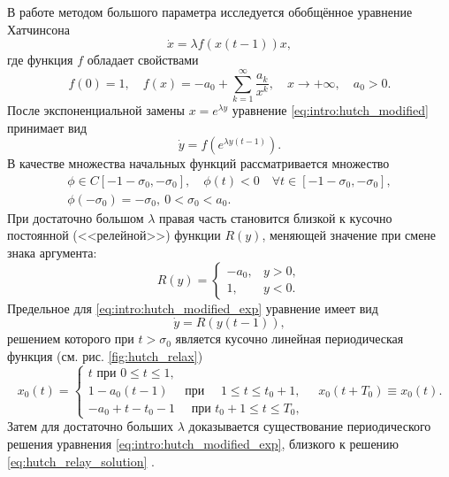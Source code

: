 В работе \cite{Kolesov2010} методом большого параметра исследуется обобщённое уравнение Хатчинсона
\begin{equation}
	\label{eq:intro:hutch_modified}
	\dot{x} = \lambda f(x(t - 1)) x,
\end{equation}
%
где функция $f$ обладает свойствами
\[
f(0) = 1, \quad f(x) = -a_0 + \sum\limits_{k = 1}^{\infty} \frac{a_k}{x^k}, \quad x \to +\infty, \quad a_0 > 0.
\]
После экспоненциальной замены $x = e^{\lambda y}$ уравнение \eqref{eq:intro:hutch_modified} принимает вид
\begin{equation}
	\label{eq:intro:hutch_modified_exp}
	\dot{y} = f(e^{\lambda y(t - 1)}).
\end{equation}
В качестве множества начальных функций рассматривается множество
\begin{multline}
	\label{eq:intro:hutch_init_func}
	\phi \in C[-1 - \sigma_0, -\sigma_0],\quad \phi(t) < 0 \quad \forall t \in [-1 - \sigma_0, -\sigma_0], \\ \phi(-\sigma_0) = -\sigma_0, \ 0 < \sigma_0 < a_0.
\end{multline}
При достаточно большом $\lambda$ правая часть становится близкой к кусочно постоянной (<<релейной>>) функции $R(y)$, меняющей значение при смене знака аргумента:
\[
R(y) = \begin{cases}
	-a_0, & y > 0,\\
	1, & y < 0.
\end{cases}
\]
Предельное для \eqref{eq:intro:hutch_modified_exp} уравнение имеет вид
\begin{equation}
	\label{eq:hutch_relay}
	\dot{y} = R(y(t - 1)),
\end{equation}
решением которого при $t > \sigma_0$ является кусочно линейная периодическая функция (см. рис. \ref{fig:hutch_relax})
\begin{equation}
	\label{eq:hutch_relay_solution}
	x_0(t)=\left\{\begin{array}{l}
		t \text { при } 0 \leq t \leq 1, \\
		1-a_0(t-1) \quad \text { при } \quad 1 \leq t \leq t_0 + 1, \\
		-a_0 + t - t_0 - 1 \quad \text { при } t_0 + 1 \leq t \leq T_0,
	\end{array} \quad x_0\left(t+T_0\right) \equiv x_0(t) .\right.
\end{equation}
Затем для достаточно больших $\lambda$ доказывается существование периодического решения уравнения \eqref{eq:intro:hutch_modified_exp}, близкого к решению \eqref{eq:hutch_relay_solution} \cite{Kolesov2010}.

